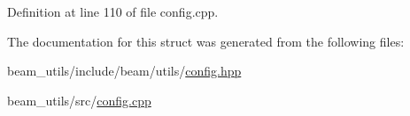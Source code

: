 Definition at line 110 of file config.\+cpp.



The documentation for this struct was generated from the following files\+:\begin{DoxyCompactItemize}
\item 
beam\+\_\+utils/include/beam/utils/\hyperlink{config_8hpp}{config.\+hpp}\item 
beam\+\_\+utils/src/\hyperlink{config_8cpp}{config.\+cpp}\end{DoxyCompactItemize}
